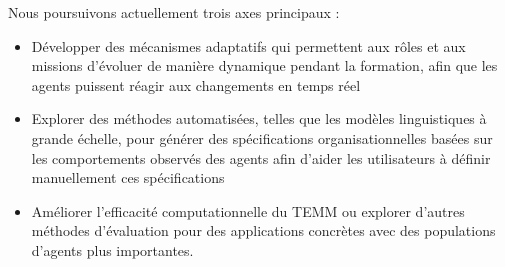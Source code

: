 Nous poursuivons actuellement trois axes principaux :
%
\begin{itemize}
    \item Développer des mécanismes adaptatifs qui permettent aux rôles et aux missions d'évoluer de manière dynamique pendant la formation, afin que les agents puissent réagir aux changements en temps réel
    \item Explorer des méthodes automatisées, telles que les modèles linguistiques à grande échelle, pour générer des spécifications organisationnelles basées sur les comportements observés des agents afin d'aider les utilisateurs à définir manuellement ces spécifications
    \item Améliorer l'efficacité computationnelle du TEMM ou explorer d'autres méthodes d'évaluation pour des applications concrètes avec des populations d'agents plus importantes.
\end{itemize}